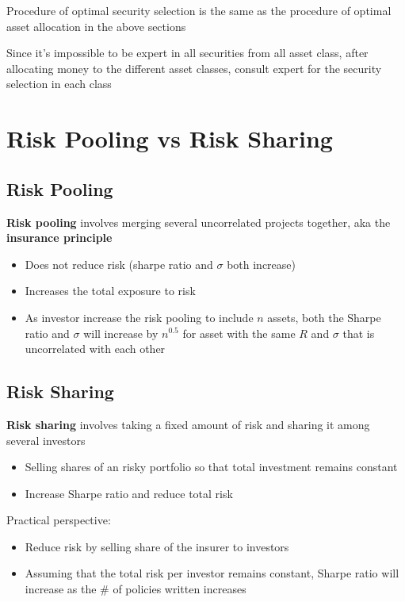 \documentclass[]{book}
\theoremstyle{definition}
\theoremstyle{definition}
\theoremstyle{remark}
\begin{document}
Procedure of optimal security selection is the same as the procedure of
optimal asset allocation in the above sections

Since it's impossible to be expert in all securities from all asset
class, after allocating money to the different asset classes, consult
expert for the security selection in each class

\section{Risk Pooling vs Risk
Sharing}\label{risk-pooling-vs-risk-sharing}

\subsection{Risk Pooling}\label{risk-pooling}

\textbf{Risk pooling} involves merging several uncorrelated projects
together, aka the \textbf{insurance principle}

\begin{itemize}
\item
  Does not reduce risk (sharpe ratio and \(\sigma\) both increase)
\item
  Increases the total exposure to risk
\item
  As investor increase the risk pooling to include \(n\) assets, both
  the Sharpe ratio and \(\sigma\) will increase by \(n^{0.5}\) for asset
  with the same \(R\) and \(\sigma\) that is uncorrelated with each
  other
\end{itemize}

\subsection{Risk Sharing}\label{risk-sharing}

\textbf{Risk sharing} involves taking a fixed amount of risk and sharing
it among several investors

\begin{itemize}
\item
  Selling shares of an risky portfolio so that total investment remains
  constant
\item
  Increase Sharpe ratio and reduce total risk
\end{itemize}

Practical perspective:

\begin{itemize}
\item
  Reduce risk by selling share of the insurer to investors
\item
  Assuming that the total risk per investor remains constant, Sharpe
  ratio will increase as the \# of policies written increases
\end{itemize}
\end{document}
